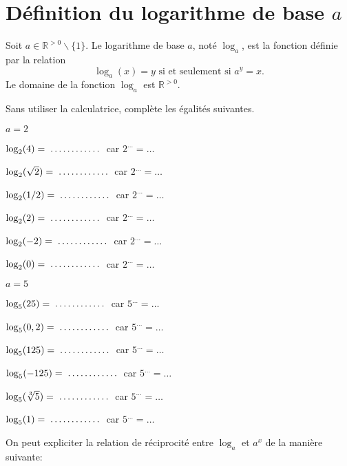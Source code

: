 \documentclass[a4paper,12pt,singlepage]{report}
\newcommand{\IR}{\mathbb{R}}
\newcommand{\jdot}[1]{ \makebox[#1]{\dotfill}}
\begin{document}
\section{Définition du logarithme de base \(a\)}
\label{sec:org8a260f8}

\begin{definition}
Soit \(a\in\IR^{>0}\backslash\{1\}\). Le logarithme de base \(a\), noté \(\log_a\),
est la fonction définie par la relation
\[
\log_a(x)=y \text{ si et seulement si } a^y=x.
\]
Le domaine de la fonction \(\log_a\) est \(\IR^{>0}\).
\end{definition}

\begin{exemple}
Sans utiliser la calculatrice, complète les égalités suivantes.
\par \setlength{\columnseprule}{0 pt}
          \begin{minipage}[t]{\linewidth}
          \begin{multicols}{2}

\(a=2\)

\(\log_2(4)=\jdot{2cm}\) car \(2^{\ldots}=\ldots\)

\(\log_2(\sqrt{2})=\jdot{2cm}\) car \(2^{\ldots}=\ldots\)

\(\log_2(1/2)=\jdot{2cm}\) car \(2^{\ldots}=\ldots\)

\(\log_2(2)=\jdot{2cm}\) car \(2^{\ldots}=\ldots\)

\(\log_2(-2)=\jdot{2cm}\) car \(2^{\ldots}=\ldots\)

\(\log_2(0)=\jdot{2cm}\) car \(2^{\ldots}=\ldots\)

\(a=5\)

\(\log_5(25)=\jdot{2cm}\) car \(5^{\ldots}=\ldots\)

\(\log_5(0,2)=\jdot{2cm}\) car \(5^{\ldots}=\ldots\)

\(\log_5(125)=\jdot{2cm}\) car \(5^{\ldots}=\ldots\)

\(\log_5(-125)=\jdot{2cm}\) car \(5^{\ldots}=\ldots\)

\(\log_5(\sqrt[3]{5})=\jdot{2cm}\) car \(5^{\ldots}=\ldots\)

\(\log_5(1)=\jdot{2cm}\) car \(5^{\ldots}=\ldots\)



\end{multicols}\end{minipage}
\end{exemple}

On peut expliciter la relation de réciprocité entre \(\log_a\) et \(a^x\) de la
manière suivante:
\end{document}
